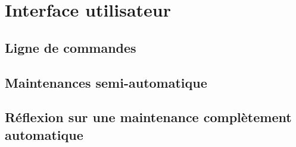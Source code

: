 
\chapter{Interface utilisateur}

\section{Ligne de commandes}

\section{Maintenances semi-automatique}

\section{Réflexion sur une maintenance complètement automatique}

